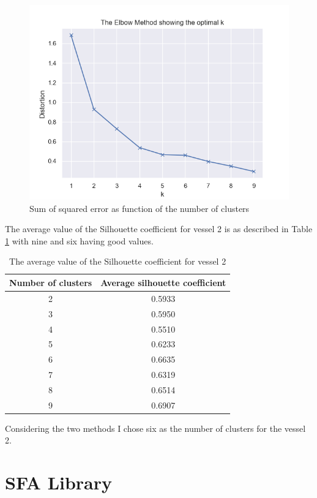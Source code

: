 \begin{figure}[]
\centering
\includegraphics[width=0.8\linewidth]{Chapters/img/elbow_method.png}
\caption{Sum of squared error as function of the number of clusters}
\label{fig:elbow_method}
\end{figure}


The average value of the Silhouette coefficient for vessel 2 is as described in Table \ref{table:vessel2_silhouette} with nine and six having good values.

\begin {table}[h]
\caption {The average value of the Silhouette coefficient for vessel 2}
\begin{center}
\begin{tabular}{c|c}
\textbf{Number of clusters} & \textbf{Average silhouette coefficient}  \\
\hline
2 & 0.5933  \\
3 & 0.5950  \\
4 & 0.5510  \\
5 & 0.6233  \\
6 & 0.6635  \\
7 & 0.6319  \\
8 & 0.6514  \\
9 & 0.6907  
\label{table:vessel2_silhouette}
\end{tabular}
\end{center}
\end {table}


Considering the two methods I chose six as the number of clusters for the vessel 2.




\section{SFA Library} %
\label{sub:sfa_library}

